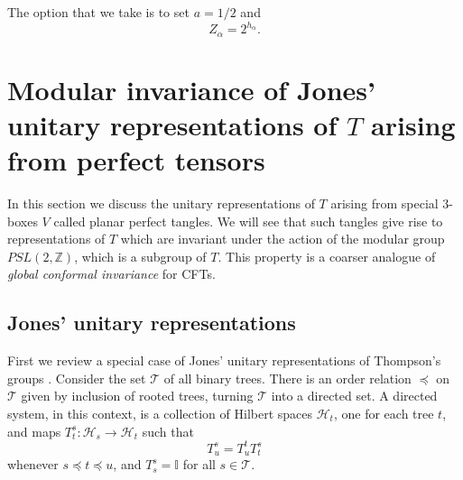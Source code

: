 \documentclass[11pt,oneside]{amsart}
\theoremstyle{plain}%
\theoremstyle{definition}
\theoremstyle{remark}
\begin{document}
The option that we take is to set $a=1/2$ and
\begin{equation}\label{eq:ffield}
  Z_\alpha = 2^{h_\alpha}.
\end{equation}


\section{\texorpdfstring{Modular invariance of Jones' unitary representations of $T$ arising from perfect tensors}{Modular invariance of Jones' unitary representations of T arising from perfect tensors}}\label{sec:modularinvariance}
In this section we discuss the unitary representations of $T$ arising from special 3-boxes $V$ called planar perfect tangles. We will see that such tangles give rise to representations of $T$ which are invariant under the action of the modular group $PSL(2,\mathbb{Z})$, which is a subgroup of $T$. This property is a coarser analogue of \emph{global conformal invariance} for CFTs.



\subsection{Jones' unitary representations}

First we review a special case of Jones' unitary representations of Thompson's groups \cites{jones_unitary_2014,jones_no-go_2016}.
Consider the set $\mathcal{T}$ of all binary trees. There is an order relation $\preceq$ on $\mathcal{T}$ given by inclusion of rooted trees, turning $\mathcal{T}$ into a directed set. A directed system, in this context, is a collection of Hilbert spaces $\mathcal{H}_t$, one for each tree $t$, and maps $T^s_t\colon\mathcal{H}_s\to\mathcal{H}_t$ such that
\begin{equation}
	T^s_u=T^t_u T^s_t
\end{equation}
whenever $s\preceq t\preceq u$, and $T^s_s=\mathbb{I}$ for all $s\in\mathcal{T}$.
\end{document}
